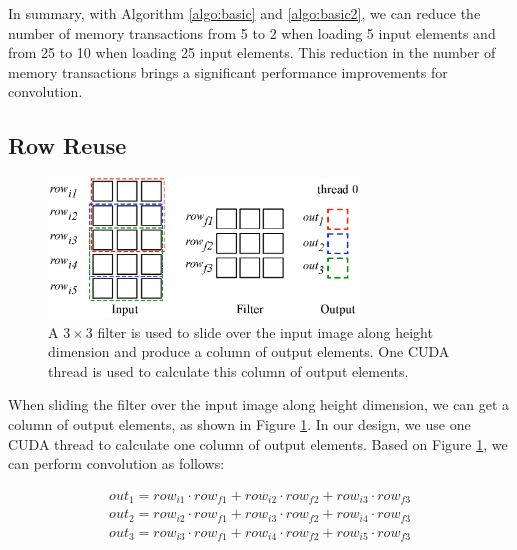 In summary, with Algorithm \ref{algo:basic} and \ref{algo:basic2}, we can reduce the number of memory transactions from 5 to 2 when loading
5 input elements and from 25 to 10 when loading 25 input elements. This reduction in the number of memory transactions brings a significant
performance improvements for convolution.

\subsection{Row Reuse}
\begin{figure}
	\centering
	\includegraphics[width=\columnwidth,height=3.7cm]{./figure/rowreuse.eps}
\caption{A $3 \times 3$ filter is used to slide over the input image along height dimension and produce a column of output elements. One CUDA thread is used to calculate this column of output elements.}
\label{fig:rowreuse}
\end{figure}

When sliding the filter over the input image along height dimension, we can get a column of output elements, as shown in Figure
\ref{fig:rowreuse}. In our design, we use one CUDA thread to calculate one column of output elements. Based on Figure \ref{fig:rowreuse},
we can perform convolution as follows:

\begin{gather*}
  out_1=row_{i1} \cdot row_{f1} + row_{i2} \cdot row_{f2} + row_{i3} \cdot row_{f3} \\
out_{2}=row_{i2} \cdot row_{f1} + row_{i3} \cdot row_{f2} + row_{i4} \cdot row_{f3} \\
	out_{3}=row_{i3} \cdot row_{f1} + row_{i4} \cdot row_{f2} + row_{i5} \cdot row_{f3}
\end{gather*}

